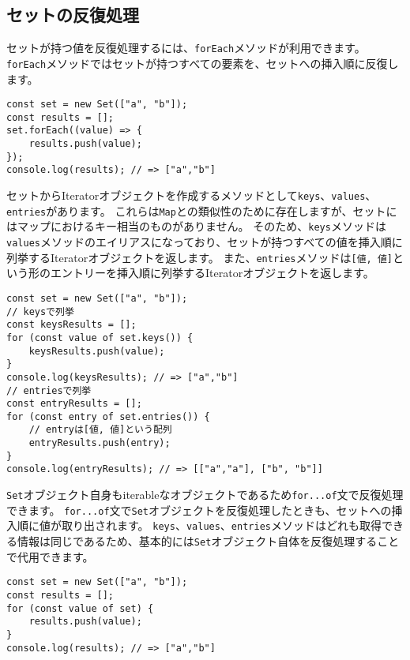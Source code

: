 \hypertarget{set-iteration}{%
\subsection{セットの反復処理}\label{set-iteration}}

セットが持つ値を反復処理するには、\texttt{forEach}メソッドが利用できます。
\texttt{forEach}メソッドではセットが持つすべての要素を、セットへの挿入順に反復します。

\begin{lstlisting}
const set = new Set(["a", "b"]);
const results = [];
set.forEach((value) => {
    results.push(value);
});
console.log(results); // => ["a","b"]
\end{lstlisting}

セットからIteratorオブジェクトを作成するメソッドとして\texttt{keys}、\texttt{values}、\texttt{entries}があります。
これらは\texttt{Map}との類似性のために存在しますが、セットにはマップにおけるキー相当のものがありません。
そのため、\texttt{keys}メソッドは\texttt{values}メソッドのエイリアスになっており、セットが持つすべての値を挿入順に列挙するIteratorオブジェクトを返します。
また、\texttt{entries}メソッドは\texttt{[値, 値]}という形のエントリーを挿入順に列挙するIteratorオブジェクトを返します。

\begin{lstlisting}
const set = new Set(["a", "b"]);
// keysで列挙
const keysResults = [];
for (const value of set.keys()) {
    keysResults.push(value);
}
console.log(keysResults); // => ["a","b"]
// entriesで列挙
const entryResults = [];
for (const entry of set.entries()) {
    // entryは[値, 値]という配列
    entryResults.push(entry);
}
console.log(entryResults); // => [["a","a"], ["b", "b"]]
\end{lstlisting}

\texttt{Set}オブジェクト自身もiterableなオブジェクトであるため\texttt{for...of}文で反復処理できます。
\texttt{for...of}文で\texttt{Set}オブジェクトを反復処理したときも、セットへの挿入順に値が取り出されます。
\texttt{keys}、\texttt{values}、\texttt{entries}メソッドはどれも取得できる情報は同じであるため、基本的には\texttt{Set}オブジェクト自体を反復処理することで代用できます。

\begin{lstlisting}
const set = new Set(["a", "b"]);
const results = [];
for (const value of set) {
    results.push(value);
}
console.log(results); // => ["a","b"]
\end{lstlisting}

